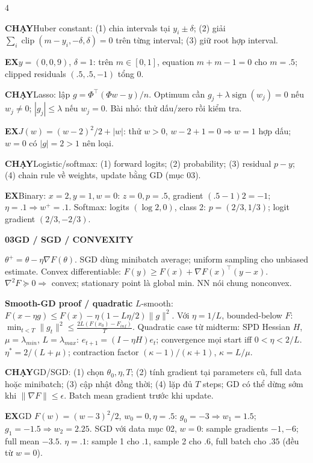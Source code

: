 \documentclass[a4paper]{article}
\newcommand{\topic}[2]{\par\addvspace{.8pt}%
  \begingroup\setlength{\fboxsep}{0.5pt}%
  \noindent\colorbox{structure}{\parbox{\dimexpr\linewidth-2\fboxsep\relax}{%
    \color{white}\fontsize{6.5}{7.1}\selectfont\bfseries #1\enspace #2}}%
  \endgroup\par\nobreak\vspace{.3pt}\nobreak}
\newcommand{\run}[1]{\key{CHẠY}#1}
\newcommand{\key}[1]{\par\textcolor{structure}{\textbf{#1}}\enspace}
\newcommand{\note}[4]{\par\begingroup\setlength{\fboxsep}{0.15pt}%
  \noindent\colorbox{#1}{\parbox{\dimexpr\linewidth-2\fboxsep\relax}{%
    \RaggedRight\textcolor{#2}{\textbf{#3}}\enspace #4}}%
  \endgroup\par}
\newcommand{\ex}[1]{\note{examplebg}{example}{EX}{#1}}
\newcommand{\norm}[1]{\lVert#1\rVert}
\begin{document}
\begin{multicols*}{4}
\run{Huber constant: (1) chia intervals tại $y_i\pm\delta$; (2) giải $\sum_i\operatorname{clip}(m-y_i,-\delta,\delta)=0$ trên từng interval; (3) giữ root hợp interval.}
\ex{$y=(0,0,9)$, $\delta=1$: trên $m\in[0,1]$, equation $m+m-1=0$ cho $m=.5$; clipped residuals $(.5,.5,-1)$ tổng $0$.}
\run{Lasso: lập $g=\Phi^\top(\Phi w-y)/n$. Optimum cần $g_j+\lambda\operatorname{sign}(w_j)=0$ nếu $w_j\ne0$; $|g_j|\le\lambda$ nếu $w_j=0$. Bài nhỏ: thử dấu/zero rồi kiểm tra.}
\ex{$J(w)=(w-2)^2/2+|w|$: thử $w>0$, $w-2+1=0\Rightarrow w=1$ hợp dấu; $w=0$ có $|g|=2>1$ nên loại.}
\run{Logistic/softmax: (1) forward logits; (2) probability; (3) residual $p-y$; (4) chain rule về weights, update bằng GD (mục 03).}
\ex{Binary: $x=2,y=1,w=0$: $z=0,p=.5$, gradient $(.5-1)2=-1$; $\eta=.1\Rightarrow w^+=.1$. Softmax: logits $(\log2,0)$, class 2: $p=(2/3,1/3)$; logit gradient $(2/3,-2/3)$.}

\topic{03}{GD / SGD / CONVEXITY}
$\theta^+=\theta-\eta\nabla F(\theta)$. SGD dùng minibatch average; uniform sampling cho unbiased estimate. Convex differentiable:
$F(y)\ge F(x)+\nabla F(x)^\top(y-x).$
$\nabla^2F\succeq0\Rightarrow$ convex; stationary point là global min. NN nói chung nonconvex.
\key{Smooth-GD proof / quadratic}
$L$-smooth: $F(x-\eta g)\le F(x)-\eta(1-L\eta/2)\norm g^2$.
Với $\eta=1/L$, bounded-below $F$:
$\min_{t<T}\norm{g_t}^2\le\frac{2L(F(x_0)-F_{inf})}{T}.$
Quadratic case từ midterm: SPD Hessian $H$, $\mu=\lambda_{min}$, $L=\lambda_{max}$:
$e_{t+1}=(I-\eta H)e_t$; convergence mọi start iff $0<\eta<2/L$.
$\eta^*=2/(L+\mu)$; contraction factor $(\kappa-1)/(\kappa+1)$, $\kappa=L/\mu$.
\run{GD/SGD: (1) chọn $\theta_0,\eta,T$; (2) tính gradient tại parameters cũ, full data hoặc minibatch; (3) cập nhật đồng thời; (4) lặp đủ $T$ steps; GD có thể dừng sớm khi $\norm{\nabla F}\le\epsilon$. Batch mean gradient trước khi update.}
\ex{GD $F(w)=(w-3)^2/2$, $w_0=0,\eta=.5$: $g_0=-3\Rightarrow w_1=1.5$; $g_1=-1.5\Rightarrow w_2=2.25$. SGD với data mục 02, $w=0$: sample gradients $-1,-6$; full mean $-3.5$. $\eta=.1$: sample 1 cho $.1$, sample 2 cho $.6$, full batch cho $.35$ (đều từ $w=0$).}


\end{multicols*}
\end{document}
